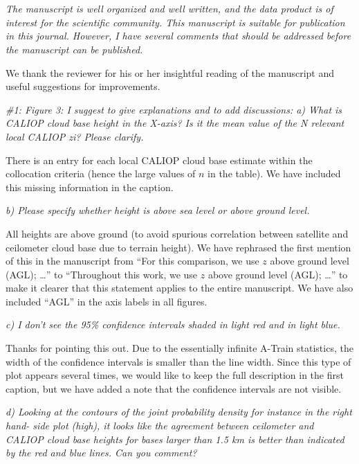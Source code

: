 \documentclass[12pt,a4paper]{responses}
\begin{document}
\section{}

\textit{The manuscript is well organized and well written, and the data product
  is of interest for the scientific community.  This manuscript is suitable for
  publication in this journal.  However, I have several comments that should be
  addressed before the manuscript can be published.}

We thank the reviewer for his or her insightful reading of the manuscript and
useful suggestions for improvements.

\textit{\#1: Figure 3: I suggest to give explanations and to add discussions: a)
  What is CALIOP cloud base height in the X-axis?  Is it the mean value of the N
  relevant local CALIOP zi? Please clarify.}

There is an entry for each local CALIOP cloud base estimate within the
collocation criteria (hence the large values of $n$ in the table).  We have
included this missing information in the caption.

\textit{b) Please specify whether height is above sea level or above ground
  level.}

All heights are above ground (to avoid spurious correlation between satellite
and ceilometer cloud base due to terrain height).  We have rephrased the first
mention of this in the manuscript from ``For this comparison, we use $z$ above
ground level (AGL); \dots'' to ``Throughout this work, we use $z$ above ground
level (AGL); \dots'' to make it clearer that this statement applies to the
entire manuscript.  We have also included ``AGL'' in the axis labels in all
figures.

\textit{c) I don’t see the 95\% confidence intervals shaded in light red and in
  light blue.}

Thanks for pointing this out.  Due to the essentially infinite A-Train
statistics, the width of the confidence intervals is smaller than the line
width.  Since this type of plot appears several times, we would like to keep the
full description in the first caption, but we have added a note that the
confidence intervals are not visible.

\textit{d) Looking at the contours of the joint probability density for instance
  in the right hand- side plot (high), it looks like the agreement between
  ceilometer and CALIOP cloud base heights for bases larger than 1.5 km is
  better than indicated by the red and blue lines.  Can you comment?  }
\end{document}
